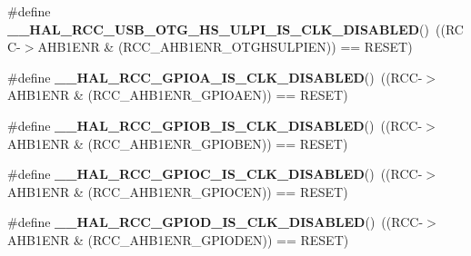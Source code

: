\begin{DoxyCompactItemize}
\item 
\mbox{\label{group___r_c_c_ex___peripheral___clock___enable___disable___status_ga22ba871dc6c91cf2f44de1ac4d2727eb}} 
\#define {\bfseries \+\_\+\+\_\+\+H\+A\+L\+\_\+\+R\+C\+C\+\_\+\+U\+S\+B\+\_\+\+O\+T\+G\+\_\+\+H\+S\+\_\+\+U\+L\+P\+I\+\_\+\+I\+S\+\_\+\+C\+L\+K\+\_\+\+D\+I\+S\+A\+B\+L\+ED}()~((R\+CC-\/$>$A\+H\+B1\+E\+NR \& (R\+C\+C\+\_\+\+A\+H\+B1\+E\+N\+R\+\_\+\+O\+T\+G\+H\+S\+U\+L\+P\+I\+EN)) == R\+E\+S\+ET)
\item 
\mbox{\label{group___r_c_c_ex___peripheral___clock___enable___disable___status_ga2d73b007700fe1576c7965ce677148bd}} 
\#define {\bfseries \+\_\+\+\_\+\+H\+A\+L\+\_\+\+R\+C\+C\+\_\+\+G\+P\+I\+O\+A\+\_\+\+I\+S\+\_\+\+C\+L\+K\+\_\+\+D\+I\+S\+A\+B\+L\+ED}()~((R\+CC-\/$>$A\+H\+B1\+E\+NR \& (R\+C\+C\+\_\+\+A\+H\+B1\+E\+N\+R\+\_\+\+G\+P\+I\+O\+A\+EN)) == R\+E\+S\+ET)
\item 
\mbox{\label{group___r_c_c_ex___peripheral___clock___enable___disable___status_ga9b9353035473ac5f144f6e5385c4bebb}} 
\#define {\bfseries \+\_\+\+\_\+\+H\+A\+L\+\_\+\+R\+C\+C\+\_\+\+G\+P\+I\+O\+B\+\_\+\+I\+S\+\_\+\+C\+L\+K\+\_\+\+D\+I\+S\+A\+B\+L\+ED}()~((R\+CC-\/$>$A\+H\+B1\+E\+NR \& (R\+C\+C\+\_\+\+A\+H\+B1\+E\+N\+R\+\_\+\+G\+P\+I\+O\+B\+EN)) == R\+E\+S\+ET)
\item 
\mbox{\label{group___r_c_c_ex___peripheral___clock___enable___disable___status_ga5e939d98ecca025c028bd1d837b84c81}} 
\#define {\bfseries \+\_\+\+\_\+\+H\+A\+L\+\_\+\+R\+C\+C\+\_\+\+G\+P\+I\+O\+C\+\_\+\+I\+S\+\_\+\+C\+L\+K\+\_\+\+D\+I\+S\+A\+B\+L\+ED}()~((R\+CC-\/$>$A\+H\+B1\+E\+NR \& (R\+C\+C\+\_\+\+A\+H\+B1\+E\+N\+R\+\_\+\+G\+P\+I\+O\+C\+EN)) == R\+E\+S\+ET)
\item 
\mbox{\label{group___r_c_c_ex___peripheral___clock___enable___disable___status_ga01c2b4166bbcf59a529cd3c5f8b93d76}} 
\#define {\bfseries \+\_\+\+\_\+\+H\+A\+L\+\_\+\+R\+C\+C\+\_\+\+G\+P\+I\+O\+D\+\_\+\+I\+S\+\_\+\+C\+L\+K\+\_\+\+D\+I\+S\+A\+B\+L\+ED}()~((R\+CC-\/$>$A\+H\+B1\+E\+NR \& (R\+C\+C\+\_\+\+A\+H\+B1\+E\+N\+R\+\_\+\+G\+P\+I\+O\+D\+EN)) == R\+E\+S\+ET)

\end{DoxyCompactItemize}
